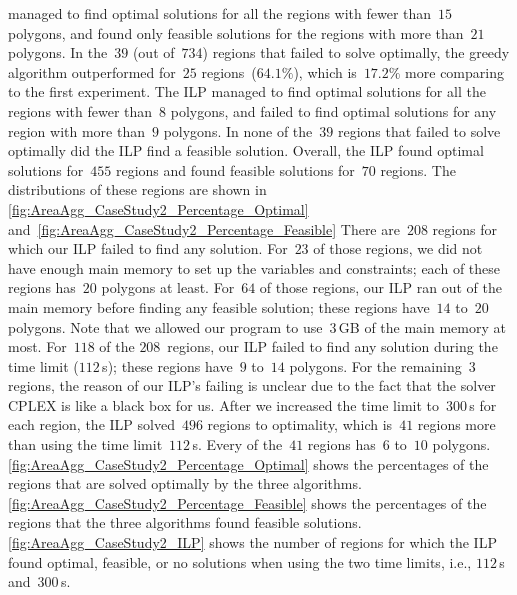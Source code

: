 \Astar managed to find optimal solutions 
for all the regions with fewer than~$15$ polygons, and 
found only feasible solutions for the regions 
with more than~$21$ polygons.
%
In the~$39$ (out of~$734$) regions 
that \Astar failed to solve optimally,
the greedy algorithm outperformed \Astar 
for~$25$ regions~($64.1\%$), 
which is~$17.2\%$ more comparing to the first experiment.
%
The ILP managed to find optimal solutions 
for all the regions with fewer than~$8$ polygons,
and failed to find optimal solutions
for any region with more than~$9$ polygons.
In none of the~$39$ regions 
that \Astar failed to solve optimally
did the ILP find a feasible solution.
Overall, the ILP found optimal solutions for~$455$ regions
and found feasible solutions for~$70$ regions.
The distributions of these regions are shown in
\figs\ref{fig:AreaAgg_CaseStudy2_Percentage_Optimal}
and~\fig\ref{fig:AreaAgg_CaseStudy2_Percentage_Feasible}
There are~$208$ regions for which 
our ILP failed to find any solution.
For~$23$ of those regions, 
we did not have enough main memory 
to set up the variables and constraints;
each of these regions has~$20$ polygons at least.
For~$64$ of those regions, 
our ILP ran out of the main memory 
before finding any feasible solution;
these regions have~$14$ to~$20$ polygons.
Note that we allowed our program to use~$3\,$GB 
of the main memory at most.
For~$118$ of the $208$~regions, 
our ILP failed to find any solution
during the time limit ($112\,$s);
these regions have~$9$ to~$14$ polygons.
For the remaining~$3$ regions, 
the reason of our ILP's failing is unclear 
due to the fact that 
the solver CPLEX is like a black box for us.
After we increased the time limit to~$300\,$s for each region, 
the ILP solved~$496$ regions to optimality, which 
is~$41$ regions more than using the time limit~$112\,$s.
Every of the~$41$ regions has~$6$ to~$10$ polygons.
\fig\ref{fig:AreaAgg_CaseStudy2_Percentage_Optimal}
shows the percentages of the regions 
that are solved optimally by the three algorithms.
\fig\ref{fig:AreaAgg_CaseStudy2_Percentage_Feasible} 
shows the percentages of the regions 
that the three algorithms found feasible solutions.
\fig\ref{fig:AreaAgg_CaseStudy2_ILP} shows 
the number of regions for which 
the ILP found optimal, feasible, or no solutions 
when using the two time limits, i.e., $112\,$s and~$300\,$s.


